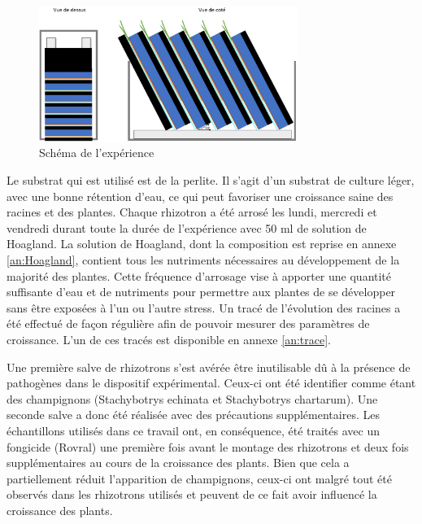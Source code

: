 \begin{figure}[ht]
\centering
\includegraphics[width=0.75\textwidth]{Image/montage.png}
\caption{Schéma de l'expérience}
\label{fig:montage}
\end{figure}

Le substrat qui est utilisé est de la perlite.
Il s'agit d'un substrat de culture léger, avec une bonne rétention d'eau, ce qui peut favoriser une croissance saine des racines et des plantes.
Chaque rhizotron a été arrosé les lundi, mercredi et vendredi durant toute la durée de l'expérience avec 50 ml de solution de Hoagland.
La solution de Hoagland, dont la composition est reprise en annexe \ref{an:Hoagland}, contient tous les nutriments nécessaires au développement de la majorité des plantes.
Cette fréquence d'arrosage vise à apporter une quantité suffisante d'eau et de nutriments pour permettre aux plantes de se développer sans être exposées à l'un ou l'autre stress.
Un tracé de l'évolution des racines a été effectué de façon régulière afin de pouvoir mesurer des paramètres de croissance.
L'un de ces tracés est disponible en annexe \ref{an:trace}.
\newline

Une première salve de rhizotrons s'est avérée être inutilisable dû à la présence de pathogènes dans le dispositif expérimental.
Ceux-ci ont été identifier comme étant des champignons (Stachybotrys echinata et Stachybotrys chartarum).
Une seconde salve a donc été réalisée avec des précautions supplémentaires.
Les échantillons utilisés dans ce travail ont, en conséquence, été traités avec un fongicide (Rovral) une première fois avant le montage des rhizotrons et deux fois supplémentaires au cours de la croissance des plants.
Bien que cela a partiellement réduit l'apparition de champignons, ceux-ci ont malgré tout été observés dans les rhizotrons utilisés et peuvent de ce fait avoir influencé la croissance des plants.

